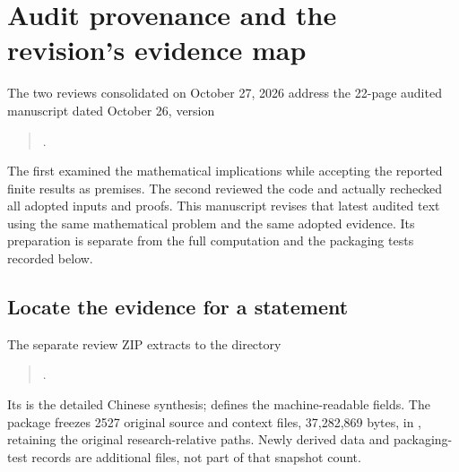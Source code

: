 \section{Audit provenance and the revision's evidence map}\label{app:audit}
The two reviews consolidated on October 27, 2026 address the 22-page
audited manuscript dated October 26, version
\begin{quote}\small\raggedright
{}.
\end{quote}
The first examined the
mathematical implications while accepting the reported finite results as
premises. The second reviewed the code and actually rechecked all adopted
inputs and proofs. This manuscript revises that latest audited text using
the same mathematical problem and the same adopted evidence. Its
preparation is separate from the full computation and the packaging tests
recorded below.

\subsection{Locate the evidence for a statement}
The separate review ZIP extracts to the directory
\begin{quote}\small\raggedright
{}.
\end{quote}
Its  is the detailed
Chinese synthesis;  defines the machine-readable
fields. The package freezes 2527 original source and context files,
37,282,869 bytes, in , retaining the original
research-relative paths. Newly derived data and packaging-test records
are additional files, not part of that snapshot count.

